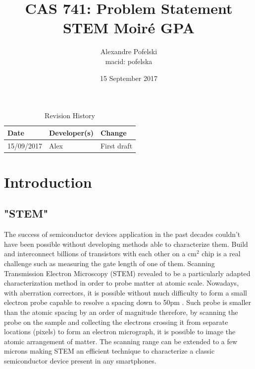 \documentclass{article}
\title{CAS 741: Problem Statement\\STEM Moir{\'e} GPA}
\author{Alexandre Pofelski \\
macid: pofelska}
\date{15 September 2017}
\begin{document}
\maketitle
\clearpage

\begin{table}[hp]
\caption{Revision History} \label{TblRevisionHistory}
\begin{tabularx}{\textwidth}{llX}
\toprule
\textbf{Date} & \textbf{Developer(s)} & \textbf{Change}\\
\midrule
15/09/2017 & Alex & First draft\\
\bottomrule
\end{tabularx}
\end{table}

\clearpage
\tableofcontents
\clearpage

\section{Introduction}
\subsection{"STEM"}
The success of semiconductor devices application in the past decades couldn't have been possible without developing methods able to characterize them. Build and interconnect billions of transistors with each other on a cm$^{2}$ chip is a real challenge such as measuring the gate length of one of them. Scanning Transmission Electron Microscopy (STEM) revealed to be a particularly adapted characterization method in order to probe matter at atomic scale. Nowadays, with aberration correctors, it is possible without much difficulty to form a small electron probe capable to resolve a spacing down to 50pm \cite{Erni2009}. Such probe is smaller than the atomic spacing by an order of magnitude therefore, by scanning the probe on the sample and collecting the electrons crossing it from separate locations (pixels) to form an electron micrograph, it is possible to image the atomic arrangement of matter. The scanning range can be extended to a few microns making STEM an efficient technique to characterize a classic semiconductor device present in any smartphones.
\end{document}
